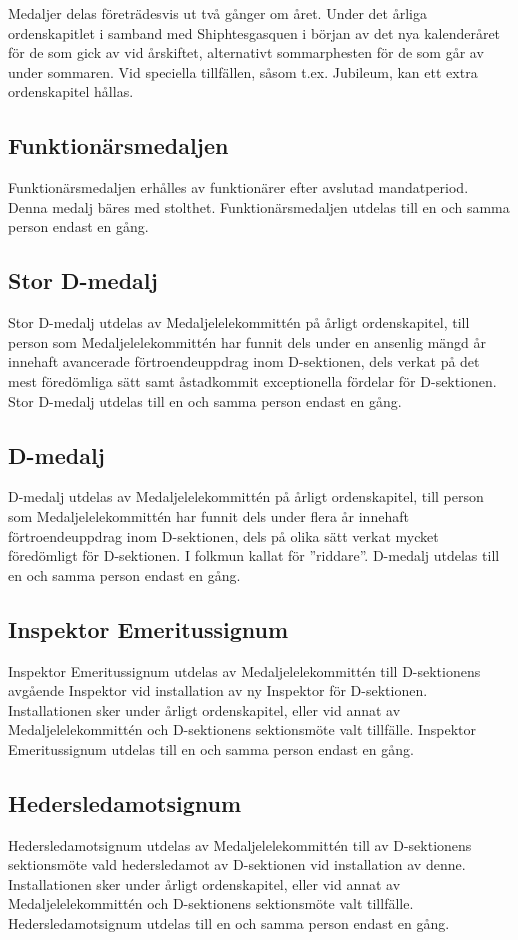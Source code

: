 \documentclass[pdfbookmarks,a4paper,11pt]{article}
\begin{document}
Medaljer delas företrädesvis ut två gånger om året. Under det årliga ordenskapitlet i samband med Shiphtesgasquen i början av det nya kalenderåret för de som gick av vid årskiftet, alternativt sommarphesten för de som går av under sommaren. Vid speciella tillfällen, såsom t.ex. Jubileum, kan ett extra ordenskapitel hållas.

\subsection{Funktionärsmedaljen}
Funktionärsmedaljen erhålles av funktionärer efter avslutad mandatperiod. Denna medalj bäres med stolthet. Funktionärsmedaljen utdelas till en och samma person endast en gång.

\subsection{Stor D-medalj}
Stor D-medalj utdelas av Medaljelelekommittén på årligt ordenskapitel, till person som Medaljelelekommittén har funnit dels under en ansenlig mängd år innehaft avancerade förtroendeuppdrag inom D-sektionen, dels verkat på det mest föredömliga sätt samt åstadkommit exceptionella fördelar för D-sektionen. Stor D-medalj utdelas till en och samma person endast en gång.

\subsection{D-medalj}
D-medalj utdelas av Medaljelelekommittén på årligt ordenskapitel, till person som Medaljelelekommittén har funnit dels under flera år innehaft förtroendeuppdrag inom D-sektionen, dels på olika sätt verkat mycket föredömligt för D-sektionen. I folkmun kallat för ''riddare''. D-medalj utdelas till en och samma person endast en gång.

\subsection{Inspektor Emeritussignum}
Inspektor Emeritussignum utdelas av Medaljelelekommittén till D-sektionens avgående Inspektor vid installation av ny Inspektor för D-sektionen. Installationen sker under årligt ordenskapitel, eller vid annat av Medaljelelekommittén och D-sektionens sektionsmöte valt tillfälle. Inspektor Emeritussignum utdelas till en och samma person endast en gång.

\subsection{Hedersledamotsignum}
Hedersledamotsignum utdelas av Medaljelelekommittén till av D-sektionens sektionsmöte vald hedersledamot av D-sektionen vid installation av denne. Installationen sker under årligt ordenskapitel, eller vid annat av Medaljelelekommittén och D-sektionens sektionsmöte valt tillfälle. Hedersledamotsignum utdelas till en och samma person endast en gång.
\end{document}
